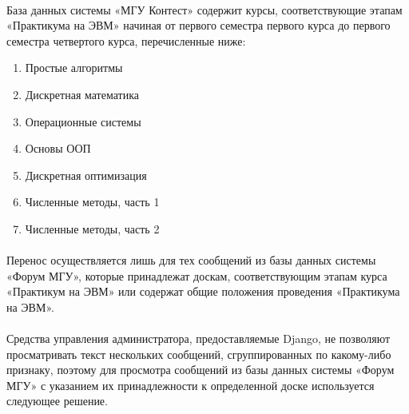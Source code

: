 \documentclass[12pt, a4paper, oneside]{article}
\begin{document}
            \paragraph{}
            База данных системы «МГУ Контест» содержит курсы, соответствующие этапам «Практикума на ЭВМ» начиная от первого семестра первого курса до первого семестра четвертого курса, перечисленные ниже:
            \begin{enumerate}
                \item Простые алгоритмы
                \item Дискретная математика
                \item Операционные системы
                \item Основы ООП
                \item Дискретная оптимизация
                \item Численные методы, часть 1
                \item Численные методы, часть 2
            \end{enumerate}
            \paragraph{}
            Перенос осуществляется лишь для тех сообщений из базы данных системы «Форум МГУ», которые принадлежат доскам, соответствующим этапам курса «Практикум на ЭВМ» или содержат общие положения проведения «Практикума на ЭВМ».
            \paragraph{}
            Средства управления администратора, предоставляемые Django, не позволяют просматривать текст нескольких сообщений, сгруппированных по какому-либо признаку, поэтому для просмотра сообщений из базы данных системы «Форум МГУ» с указанием их принадлежности к определенной доске используется следующее решение.
\end{document}
